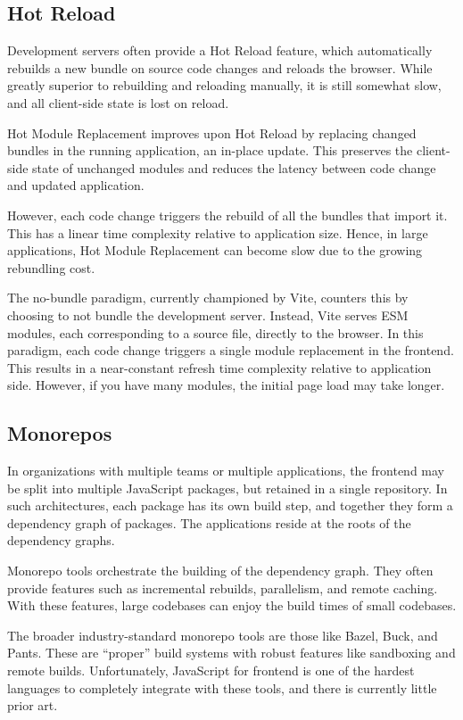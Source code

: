 \documentclass{article}
\begin{document}
\subsection{Hot Reload}

Development servers often provide a Hot Reload feature, which automatically rebuilds a new bundle on
source code changes and reloads the browser. While greatly superior to rebuilding and reloading
manually, it is still somewhat slow, and all client-side state is lost on reload.

Hot Module Replacement improves upon Hot Reload by replacing changed bundles in the running
application, an in-place update. This preserves the client-side state of unchanged modules and
reduces the latency between code change and updated application.

However, each code change triggers the rebuild of all the bundles that import it. This has a linear
time complexity relative to application size. Hence, in large applications, Hot Module Replacement
can become slow due to the growing rebundling cost.

The no-bundle paradigm, currently championed by Vite, counters this by choosing to not bundle the
development server. Instead, Vite serves ESM modules, each corresponding to a source file, directly
to the browser. In this paradigm, each code change triggers a single module replacement in the
frontend. This results in a near-constant refresh time complexity relative to application side.
However, if you have many modules, the initial page load may take longer.

\subsection{Monorepos}

In organizations with multiple teams or multiple applications, the frontend may be split into
multiple JavaScript packages, but retained in a single repository. In such architectures, each
package has its own build step, and together they form a dependency graph of packages. The
applications reside at the roots of the dependency graphs.

Monorepo tools orchestrate the building of the dependency graph. They often provide features such as
incremental rebuilds, parallelism, and remote caching. With these features, large codebases can
enjoy the build times of small codebases.

The broader industry-standard monorepo tools are those like Bazel, Buck, and Pants. These are
``proper'' build systems with robust features like sandboxing and remote builds. Unfortunately,
JavaScript for frontend is one of the hardest languages to completely integrate with these tools,
and there is currently little prior art.
\end{document}
